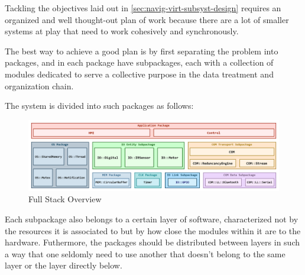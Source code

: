 Tackling the objectives laid out in \cref{sec:navig-virt-subsyst-design} requires an organized and well thought-out plan of work because there are a lot of smaller systems at play that need to work cohesively and synchronously. 


The best way to achieve a good plan is by first separating the problem into packages, and in each package have subpackages, each with a collection of modules dedicated to serve a collective purpose in the data treatment and organization chain. 

The system is divided into such packages as follows:

\begin{figure}[H]
	\centering
	\includegraphics[width=1.0\textwidth]{./img/full-stack-overview.png}
	\caption {Full Stack Overview}
	\label{fig:full-stack-overview}
	\end{figure}


Each subpackage also belongs to a certain layer of software, characterized not by the resources it is associated to but by how close the modules within it are to the hardware. Futhermore, the packages should be distributed between layers in such a way that one seldomly need to use another that doesn't belong to the same layer or the layer directly below. 


